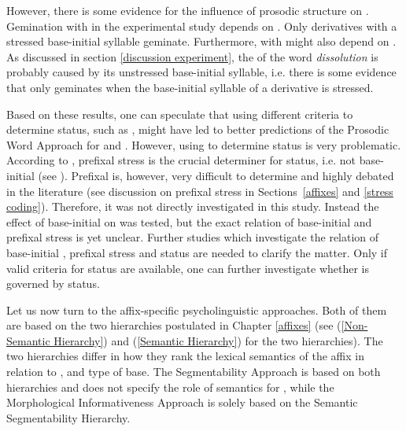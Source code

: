However, there is some evidence 
for the influence of prosodic structure on . 
Gemination with  in the experimental study depends on . Only derivatives with a stressed base-initial syllable geminate. Furthermore,  with  might also depend on . As discussed in section  \ref{discussion experiment}, the  of the word \textit{dissolution} is probably caused by its unstressed base-initial syllable, i.e. there is some evidence that  only geminates when the base-initial syllable of a derivative is stressed. 

Based on these results, one can speculate that using different criteria to determine  status, such as , might have led to better predictions of the Prosodic Word Approach for  and . 
However, using  to determine  status is very problematic. %
 According to \cite{Raffelsiefen.1999}, prefixal stress is the crucial determiner for  status, i.e. not base-initial  (see ). Prefixal  is, however, very difficult to determine and highly debated in the literature (see discussion on prefixal stress in Sections~\ref{affixes} and \ref{stress coding}). Therefore, it was not directly investigated in this study. Instead the effect of base-initial  on  was tested, but the exact relation of base-initial  and prefixal stress is yet unclear.
Further studies which investigate the relation of base-initial , prefixal stress and  status are needed to clarify the matter. Only if valid criteria for  status are available, one can further investigate whether  is governed by  status.\largerpage 

 




Let us now turn to the affix-specific psycholinguistic approaches. Both of them are based on the two  hierarchies postulated in Chapter \ref{affixes} (see  (\ref{Non-Semantic Hierarchy})  and (\ref{Semantic Hierarchy}) for the two hierarchies).
The two hierarchies differ in how they rank the lexical semantics of the affix in relation to ,  and type of base. The Segmentability Approach is based on both hierarchies and does not specify the role of semantics for , while the Morphological Informativeness Approach is solely based on the Semantic Segmentability Hierarchy.%

